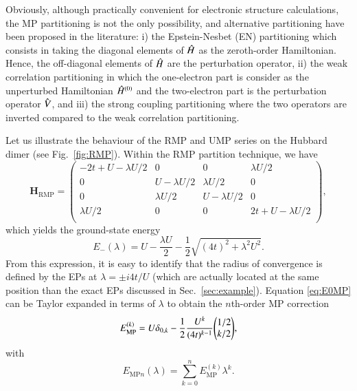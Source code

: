\documentclass[aps,prb,reprint,noshowkeys,superscriptaddress]{revtex4-1}
\newcommand{\bH}{\mathbf{H}}
\newcommand{\hH}{\Hat{H}}
\newcommand{\hV}{\Hat{V}}
\begin{document}
Obviously, although practically convenient for electronic structure calculations, the MP partitioning is not the only possibility, and alternative partitioning have been proposed in the literature:
i) the Epstein-Nesbet (EN) partitioning which consists in taking the diagonal elements of $\hH$ as the zeroth-order Hamiltonian. \cite{Nesbet_1955,Epstein_1926} 
Hence, the off-diagonal elements of $\hH$ are the perturbation operator,
ii) the weak correlation partitioning in which the one-electron part is consider as the unperturbed Hamiltonian $\hH^{(0)}$ and the two-electron part is the perturbation operator $\hV$, and 
iii) the strong coupling partitioning where the two operators are inverted compared to the weak correlation partitioning. \cite{Seidl_2018}


Let us illustrate the behaviour of the RMP and UMP series on the Hubbard dimer (see Fig.~\ref{fig:RMP}).
Within the RMP partition technique, we have 
\begin{equation}
\label{eq:H_RMP}
	\bH_\text{RMP} = 
	\begin{pmatrix}
		-2t + U - \lambda U/2	&	0					&	0					&	\lambda U/2	\\
		0						&	U - \lambda U/2 	&	\lambda U/2			&	0	\\
		0						&	\lambda U/2			&	U - \lambda U/2 	&	0	\\
		\lambda U/2 			&	0 					&	0					&	2t + U - \lambda U/2	\\
	\end{pmatrix},
\end{equation}
which yields the ground-state energy 
\begin{equation}
	\label{eq:E0MP}
	E_{-}(\lambda) = U - \frac{\lambda U}{2} - \frac{1}{2} \sqrt{(4t)^2 + \lambda ^2 U^2}.
\end{equation}
From this expression, it is easy to identify that the radius of convergence is defined by the EPs at $\lambda = \pm i 4t / U$ (which are actually located at the same position than the exact EPs discussed in Sec.~\ref{sec:example}).
Equation \eqref{eq:E0MP} can be Taylor expanded in terms of $\lambda$ to obtain the $n$th-order MP correction
\begin{equation}
	E_\text{MP}^{(k)} = U \delta_{0,k} - \frac{1}{2} \frac{U^k}{(4t)^{k-1}} \mqty( 1/2 \\ k/2),
\end{equation}
with 
\begin{equation}
	E_{\text{MP}n}(\lambda) = \sum_{k=0}^n E_\text{MP}^{(k)} \lambda^k.
\end{equation}
\end{document}
